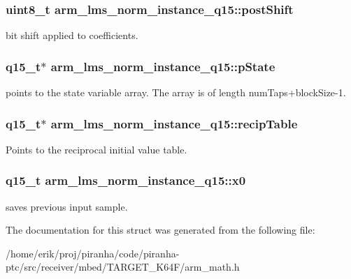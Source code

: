\subsubsection[{\texorpdfstring{post\+Shift}{postShift}}]{\setlength{\rightskip}{0pt plus 5cm}uint8\+\_\+t arm\+\_\+lms\+\_\+norm\+\_\+instance\+\_\+q15\+::post\+Shift}\hypertarget{structarm__lms__norm__instance__q15_aa0d435fbcf7dedb7179d4467e9b79e9f}{}\label{structarm__lms__norm__instance__q15_aa0d435fbcf7dedb7179d4467e9b79e9f}
bit shift applied to coefficients. 
\subsubsection[{\texorpdfstring{p\+State}{pState}}]{\setlength{\rightskip}{0pt plus 5cm}q15\+\_\+t$\ast$ arm\+\_\+lms\+\_\+norm\+\_\+instance\+\_\+q15\+::p\+State}\hypertarget{structarm__lms__norm__instance__q15_aa4de490b3bdbd03561b76ee07901c8e3}{}\label{structarm__lms__norm__instance__q15_aa4de490b3bdbd03561b76ee07901c8e3}
points to the state variable array. The array is of length num\+Taps+block\+Size-\/1. 
\subsubsection[{\texorpdfstring{recip\+Table}{recipTable}}]{\setlength{\rightskip}{0pt plus 5cm}q15\+\_\+t$\ast$ arm\+\_\+lms\+\_\+norm\+\_\+instance\+\_\+q15\+::recip\+Table}\hypertarget{structarm__lms__norm__instance__q15_a9aabb0e4c79f3db807e7a441fa36f5f8}{}\label{structarm__lms__norm__instance__q15_a9aabb0e4c79f3db807e7a441fa36f5f8}
Points to the reciprocal initial value table. 
\subsubsection[{\texorpdfstring{x0}{x0}}]{\setlength{\rightskip}{0pt plus 5cm}q15\+\_\+t arm\+\_\+lms\+\_\+norm\+\_\+instance\+\_\+q15\+::x0}\hypertarget{structarm__lms__norm__instance__q15_a3fc1d6f97d2c6d5324871de6895cb7e9}{}\label{structarm__lms__norm__instance__q15_a3fc1d6f97d2c6d5324871de6895cb7e9}
saves previous input sample. 

The documentation for this struct was generated from the following file\+:\begin{DoxyCompactItemize}
\item 
/home/erik/proj/piranha/code/piranha-\/ptc/src/receiver/mbed/\+T\+A\+R\+G\+E\+T\+\_\+\+K64\+F/arm\+\_\+math.\+h\end{DoxyCompactItemize}
